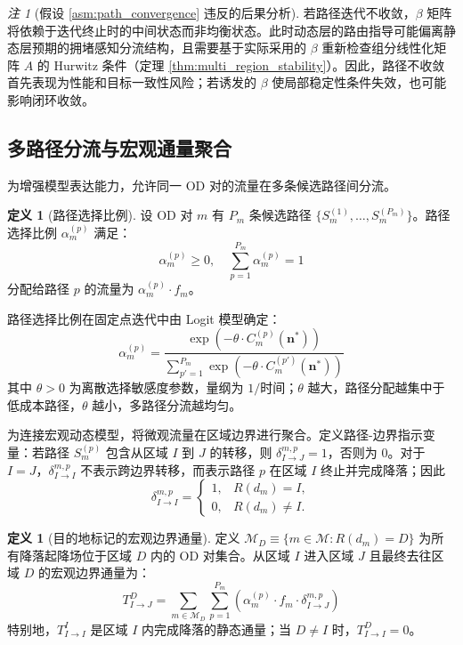 \documentclass[a4paper,12pt]{article}
\theoremstyle{plain}
\theoremstyle{definition}
\newtheorem{definition}[theorem]{定义}
\theoremstyle{remark}
\newtheorem{remark}[theorem]{注}
\begin{document}
\begin{remark}[假设 \ref{asm:path_convergence} 违反的后果分析]\label{rem:path_nonconvergence}
若路径迭代不收敛，$\beta$ 矩阵将依赖于迭代终止时的中间状态而非均衡状态。此时动态层的路由指导可能偏离静态层预期的拥堵感知分流结构，且需要基于实际采用的 $\beta$ 重新检查组分线性化矩阵 $A$ 的 Hurwitz 条件（定理 \ref{thm:multi_region_stability}）。因此，路径不收敛首先表现为性能和目标一致性风险；若诱发的 $\beta$ 使局部稳定性条件失效，也可能影响闭环收敛。
\end{remark}

\subsection{多路径分流与宏观通量聚合}

为增强模型表达能力，允许同一 OD 对的流量在多条候选路径间分流。

\begin{definition}[路径选择比例]\label{def:path_split}
设 OD 对 $m$ 有 $P_m$ 条候选路径 $\{S_m^{(1)}, \dots, S_m^{(P_m)}\}$。路径选择比例 $\alpha_m^{(p)}$ 满足：
\begin{equation}
    \alpha_m^{(p)} \ge 0, \quad \sum_{p=1}^{P_m} \alpha_m^{(p)} = 1
\end{equation}
分配给路径 $p$ 的流量为 $\alpha_m^{(p)} \cdot f_m$。
\end{definition}

路径选择比例在固定点迭代中由 Logit 模型确定：
\begin{equation}
    \alpha_m^{(p)} = \frac{\exp(-\theta \cdot C_m^{(p)}(\bm n^*))}{\sum_{p'=1}^{P_m} \exp(-\theta \cdot C_m^{(p')}(\bm n^*))}
\end{equation}
其中 $\theta > 0$ 为离散选择敏感度参数，量纲为 $1/\text{时间}$；$\theta$ 越大，路径分配越集中于低成本路径，$\theta$ 越小，多路径分流越均匀。

为连接宏观动态模型，将微观流量在区域边界进行聚合。定义路径-边界指示变量：若路径 $S_m^{(p)}$ 包含从区域 $I$ 到 $J$ 的转移，则 $\delta_{I \to J}^{m,p} = 1$，否则为 $0$。对于 $I=J$，$\delta_{I\to I}^{m,p}$ 不表示跨边界转移，而表示路径 $p$ 在区域 $I$ 终止并完成降落；因此
\begin{equation}
    \delta_{I\to I}^{m,p}=
    \begin{cases}
    1, & R(d_m)=I,\\
    0, & R(d_m)\ne I.
    \end{cases}
\end{equation}

\begin{definition}[目的地标记的宏观边界通量]\label{def:macro_flux}
定义 $\mathcal{M}_D \equiv \{m \in \mathcal{M}: R(d_m) = D\}$ 为所有降落起降场位于区域 $D$ 内的 OD 对集合。从区域 $I$ 进入区域 $J$ 且最终去往区域 $D$ 的宏观边界通量为：
\begin{equation} \label{eq:aggregation}
    T_{I \to J}^D = \sum_{m \in \mathcal{M}_D} \sum_{p=1}^{P_m} \left( \alpha_m^{(p)} \cdot f_m \cdot \delta_{I \to J}^{m,p} \right)
\end{equation}
特别地，$T_{I\to I}^I$ 是区域 $I$ 内完成降落的静态通量；当 $D\ne I$ 时，$T_{I\to I}^D=0$。
\end{definition}
\end{document}
